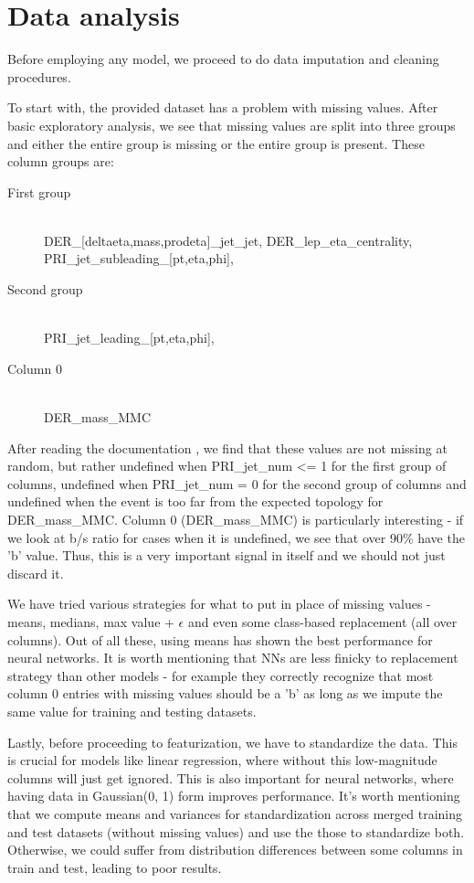 \documentclass[10pt,conference,compsocconf]{IEEEtran}
\begin{document}
\section{Data analysis}
Before employing any model, we proceed to do data imputation and cleaning procedures.

To start with, the provided dataset has a problem with missing values. After basic exploratory analysis, we see that missing values are split into three groups and either the entire group is missing or the entire group is present. These column groups are:
\begin{description}
	\item[First group] \ \\
	DER\_[deltaeta,mass,prodeta]\_jet\_jet, DER\_lep\_eta\_centrality, PRI\_jet\_subleading\_[pt,eta,phi],
	\item[Second group] \ \\
	PRI\_jet\_leading\_[pt,eta,phi],
	\item[Column 0] \ \\
	DER\_mass\_MMC
\end{description}
After reading the documentation \cite{higgsChallenge}, we find that these values are not missing at random, but rather undefined when PRI\_jet\_num <= 1 for the first group of columns, undefined when PRI\_jet\_num = 0 for the second group of columns and undefined when the event is too far from the expected topology for DER\_mass\_MMC. Column 0 (DER\_mass\_MMC) is particularly interesting - if we look at b/s ratio for cases when it is undefined, we see that over 90\% have the 'b' value. Thus, this is a very important signal in itself and we should not just discard it.
  
We have tried various strategies for what to put in place of missing values - means, medians, max value + $\epsilon$ and even some class-based replacement (all over columns). Out of all these, using means has shown the best performance for neural networks. It is worth mentioning that NNs are less finicky to replacement strategy than other models - for example they correctly recognize that most column 0 entries with missing values should be a 'b' as long as we impute the same value for training and testing datasets.

Lastly, before proceeding to featurization, we have to standardize the data. This is crucial for models like linear regression, where without this low-magnitude columns will just get ignored. This is also important for neural networks, where having data in Gaussian(0, 1) form improves performance. It's worth mentioning that we compute means and variances for standardization across merged training and test datasets (without missing values) and use the those to standardize both. Otherwise, we could suffer from distribution differences between some columns in train and test, leading to poor results.
\end{document}
